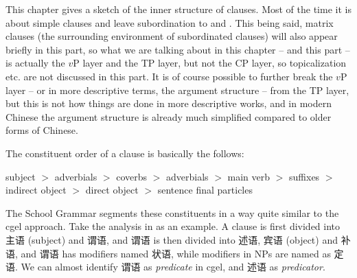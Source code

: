 \documentclass[../main.tex]{subfiles}
\begin{document}
This chapter gives a sketch of the inner structure of clauses.
Most of the time it is about simple clauses and leave subordination to  and .
This being said, matrix clauses (the surrounding environment of subordinated clauses)
will also appear briefly in this part, so what we are talking about in this chapter -- and this part -- is 
actually the $v$P layer and the TP layer, but not the CP layer, so topicalization etc. are not 
discussed in this part. It is of course possible 
to further break the $v$P layer -- or in more descriptive terms, the argument structure 
-- from the TP layer, but this is not how things are done in more descriptive works, and in modern Chinese 
the argument structure is already much simplified compared to older forms of Chinese.

The constituent order of a clause is basically the follows:

\begin{exe}
    \ex\label{ex:clause-order} subject $>$ adverbials $>$ coverbs $>$ adverbials $>$ main verb $>$ suffixes $>$ indirect object $>$ direct object $>$ sentence final particles
\end{exe}

The School Grammar segments these constituents in a way quite similar to the \ac{cgel} approach. 
Take the analysis in \citet[chap. 5]{xianhan2004} as an example.
A clause is first divided into 主语 (subject) and 谓语, and 谓语 is then divided into 述语, 宾语 (object) and 补语,
and 谓语 has modifiers named 状语, while modifiers in NPs are named as 定语. We can almost identify 
谓语 as \emph{predicate} in \ac{cgel}, and 述语 as \emph{predicator}. 
\end{document}
